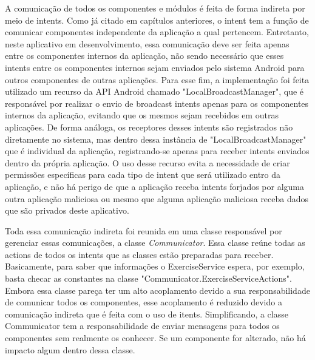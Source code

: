 A comunicação de todos os componentes e módulos é feita de forma indireta por meio de intents. Como já citado em capítulos anteriores, o intent tem a função de comunicar componentes independente da aplicação a qual pertencem. Entretanto, neste aplicativo em desenvolvimento, essa comunicação deve ser feita apenas entre os componentes internos da aplicação, não sendo necessário que esses intents entre os componentes internos sejam enviados pelo sistema Android para outros componentes de outras aplicações. Para esse fim, a implementação foi feita utilizado um recurso da API Android chamado "LocalBroadcastManager", que é responsável por realizar o envio de broadcast intents apenas para os componentes internos da aplicação, evitando que os mesmos sejam recebidos em outras aplicações. De forma análoga, os receptores desses intents são registrados não diretamente no sistema, mas dentro dessa instância de "LocalBroadcastManager" que é individual da aplicação, registrando-se apenas para receber intents enviados dentro da própria aplicação. O uso desse recurso evita a necessidade de criar permissões específicas para cada tipo de intent que será utilizado entro da aplicação, e não há perigo de que a aplicação receba intents forjados por alguma outra aplicação maliciosa ou mesmo que alguma aplicação maliciosa receba dados que são privados deste aplicativo.

Toda essa comunicação indireta foi reunida em uma classe responsável por gerenciar essas comunicações, a classe \textit{Communicator}. Essa classe reúne todas as actions de todos os intents que as classes estão preparadas para receber. Basicamente, para saber que informações o ExerciseService espera, por exemplo, basta checar as constantes na classe "Communicator.ExerciseServiceActions". Embora essa classe pareça ter um alto acoplamento devido a sua responsabilidade de comunicar todos os componentes, esse acoplamento é reduzido devido a comunicação indireta que é feita com o uso de itents. Simplificando, a classe Communicator tem a responsabilidade de enviar mensagens para todos os componentes sem realmente os conhecer. Se um componente for alterado, não há impacto algum dentro dessa classe.

